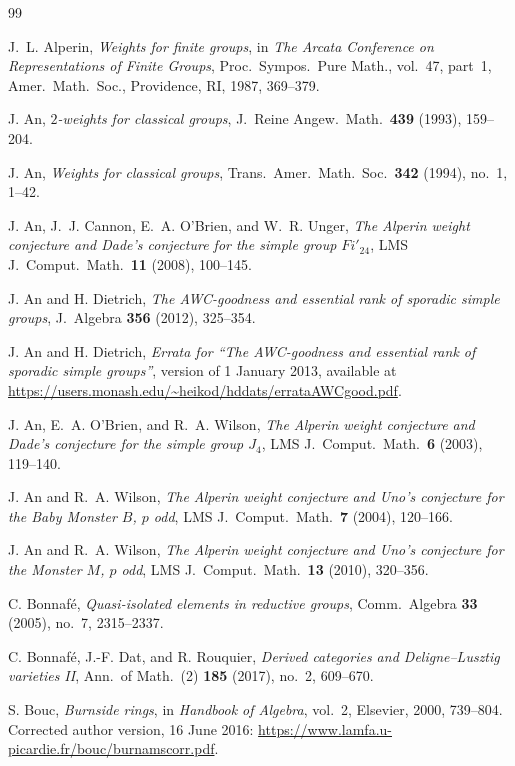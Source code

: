 \documentclass[10pt]{amsart}
\theoremstyle{definition}
\numberwithin{equation}{section}
\numberwithin{table}{section}
\begin{document}
\begin{thebibliography}{99}

J.~L. Alperin,
{\it Weights for finite groups},
in {\it The Arcata Conference on Representations of Finite Groups},
Proc.\ Sympos.\ Pure Math., vol.~47, part~1, Amer.\ Math.\ Soc.,
Providence, RI, 1987, 369--379.

J. An,
{\it $2$-weights for classical groups},
J.\ Reine Angew.\ Math.\ \textbf{439} (1993), 159--204.

J. An,
{\it Weights for classical groups},
Trans.\ Amer.\ Math.\ Soc.\ \textbf{342} (1994), no.~1, 1--42.

J. An, J.~J. Cannon, E.~A. O'Brien, and W.~R. Unger,
{\it The Alperin weight conjecture and Dade's conjecture for the simple
group $Fi'_{24}$},
LMS J.\ Comput.\ Math.\ \textbf{11} (2008), 100--145.

J. An and H. Dietrich,
{\it The AWC-goodness and essential rank of sporadic simple groups},
J.\ Algebra \textbf{356} (2012), 325--354.

J. An and H. Dietrich,
{\it Errata for ``The AWC-goodness and essential rank of sporadic simple
groups''},
version of 1 January 2013, available at
\url{https://users.monash.edu/~heikod/hddats/errataAWCgood.pdf}.

J. An, E.~A. O'Brien, and R.~A. Wilson,
{\it The Alperin weight conjecture and Dade's conjecture for the simple
group $J_4$},
LMS J.\ Comput.\ Math.\ \textbf{6} (2003), 119--140.

J. An and R.~A. Wilson,
{\it The Alperin weight conjecture and Uno's conjecture for the Baby
Monster $B$, $p$ odd},
LMS J.\ Comput.\ Math.\ \textbf{7} (2004), 120--166.

J. An and R.~A. Wilson,
{\it The Alperin weight conjecture and Uno's conjecture for the Monster
$M$, $p$ odd},
LMS J.\ Comput.\ Math.\ \textbf{13} (2010), 320--356.

C. Bonnaf\'e,
{\it Quasi-isolated elements in reductive groups},
Comm.\ Algebra \textbf{33} (2005), no.~7, 2315--2337.

C. Bonnaf\'e, J.-F. Dat, and R. Rouquier,
{\it Derived categories and Deligne--Lusztig varieties II},
Ann.\ of Math.\ (2) \textbf{185} (2017), no.~2, 609--670.

S. Bouc,
{\it Burnside rings},
in {\it Handbook of Algebra}, vol.~2, Elsevier, 2000, 739--804.
Corrected author version, 16 June 2016: \url{https://www.lamfa.u-picardie.fr/bouc/burnamscorr.pdf}.


\end{thebibliography}
\end{document}
